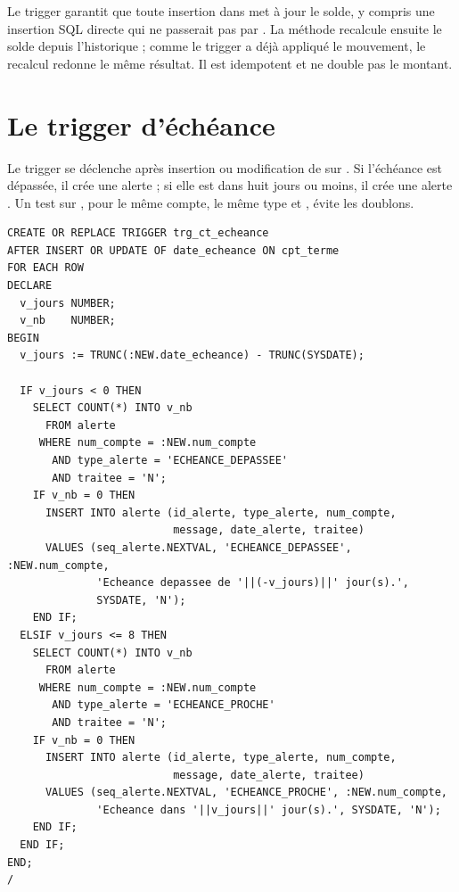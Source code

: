 \begin{remarquebox}
Le trigger garantit que toute insertion dans  met à jour le
solde, y compris une insertion SQL directe qui ne passerait pas par
. La méthode  recalcule ensuite le solde depuis
l'historique ; comme le trigger a déjà appliqué le mouvement, le recalcul
redonne le même résultat. Il est idempotent et ne double pas le montant.
\end{remarquebox}

\section{Le trigger d'échéance}

Le trigger  se déclenche après insertion ou modification
de  sur . Si l'échéance est dépassée, il
crée une alerte  ; si elle est dans huit jours ou
moins, il crée une alerte . Un test
 sur , pour le même compte, le même type et
, évite les doublons.

\begin{lstlisting}[caption={Trigger d'alerte sur l'échéance d'un compte à terme.},label={lst:trg-echeance}]
CREATE OR REPLACE TRIGGER trg_ct_echeance
AFTER INSERT OR UPDATE OF date_echeance ON cpt_terme
FOR EACH ROW
DECLARE
  v_jours NUMBER;
  v_nb    NUMBER;
BEGIN
  v_jours := TRUNC(:NEW.date_echeance) - TRUNC(SYSDATE);

  IF v_jours < 0 THEN
    SELECT COUNT(*) INTO v_nb
      FROM alerte
     WHERE num_compte = :NEW.num_compte
       AND type_alerte = 'ECHEANCE_DEPASSEE'
       AND traitee = 'N';
    IF v_nb = 0 THEN
      INSERT INTO alerte (id_alerte, type_alerte, num_compte,
                          message, date_alerte, traitee)
      VALUES (seq_alerte.NEXTVAL, 'ECHEANCE_DEPASSEE', :NEW.num_compte,
              'Echeance depassee de '||(-v_jours)||' jour(s).',
              SYSDATE, 'N');
    END IF;
  ELSIF v_jours <= 8 THEN
    SELECT COUNT(*) INTO v_nb
      FROM alerte
     WHERE num_compte = :NEW.num_compte
       AND type_alerte = 'ECHEANCE_PROCHE'
       AND traitee = 'N';
    IF v_nb = 0 THEN
      INSERT INTO alerte (id_alerte, type_alerte, num_compte,
                          message, date_alerte, traitee)
      VALUES (seq_alerte.NEXTVAL, 'ECHEANCE_PROCHE', :NEW.num_compte,
              'Echeance dans '||v_jours||' jour(s).', SYSDATE, 'N');
    END IF;
  END IF;
END;
/
\end{lstlisting}


